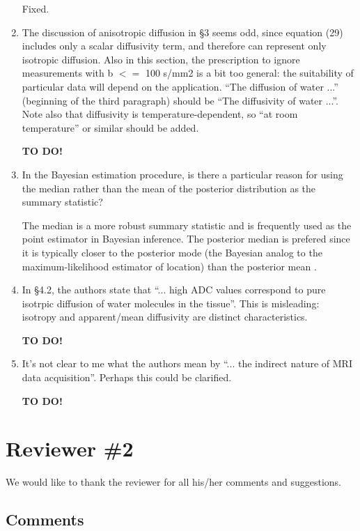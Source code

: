 \documentclass[11pt]{article}
\begin{document}
\begin{enumerate}
  Fixed.

\item The discussion of anisotropic diffusion in \S3 seems odd, since
  equation (29) includes only a scalar diffusivity term, and therefore
  can represent only isotropic diffusion. Also in this section, the
  prescription to ignore measurements with b $<=$ 100 s/mm2 is a bit
  too general: the suitability of particular data will depend on the
  application. ``The diffusion of water ...'' (beginning of the third
  paragraph) should be ``The diffusivity of water ...''. Note also
  that diffusivity is temperature-dependent, so ``at room
  temperature'' or similar should be added.

  \textbf{TO DO!}

\item In the Bayesian estimation procedure, is there a particular
  reason for using the median rather than the mean of the posterior
  distribution as the summary statistic?

  The median is a more robust summary statistic and is frequently used
  as the point estimator in Bayesian inference.  The posterior median
  is prefered since it is typically closer to the posterior mode (the
  Bayesian analog to the maximum-likelihood estimator of location)
  than the posterior mean \citep{car-lou:Bayesian}.

\item In \S4.2, the authors state that ``... high ADC values correspond
  to pure isotrpic diffusion of water molecules in the tissue''.  This
  is misleading: isotropy and apparent/mean diffusivity are distinct
  characteristics.

  \textbf{TO DO!}

\item It's not clear to me what the authors mean by ``... the indirect
  nature of MRI data acquisition''.  Perhaps this could be clarified.

  \textbf{TO DO!}

\end{enumerate}

\section*{Reviewer \#2}

We would like to thank the reviewer for all his/her comments and
suggestions.

\subsection*{Comments}
\end{document}
